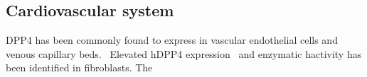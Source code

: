 \subsection{Cardiovascular system}
DPP4 has been commonly found to express in vascular endothelial cells and venous capillary beds.~\cite{Matheeussen2013,Shigeta2012} Elevated hDPP4 expression~\cite{Nemoto1999} and enzymatic hactivity has been identified in fibroblasts. The  